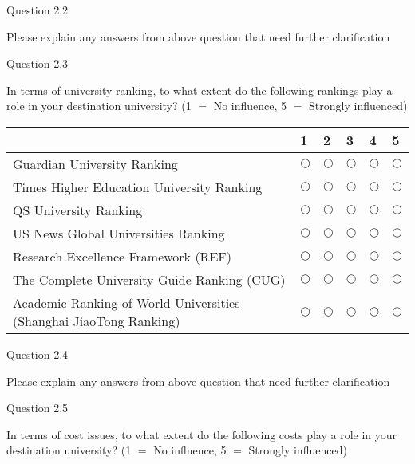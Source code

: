Question 2.2

Please explain any answers from above question that need further 
clarification

Question 2.3

In terms of university ranking, to what extent do the following rankings 
play a role in your destination university? (1 $=$ No influence, 5 $=$ 
Strongly influenced)

\begin{table}[H]
\begin{center}
\begin{tabular}{|p{6cm}|p{1cm}|p{1cm}|p{1cm}|p{1cm}|p{1cm}|}
\hline
& 
1& 
2& 
3& 
4& 
5 \\
\hline
Guardian University Ranking & 
$\bigcirc $& 
$\bigcirc $& 
$\bigcirc $& 
$\bigcirc $& 
$\bigcirc $ \\
\hline
Times Higher Education University Ranking & 
$\bigcirc $& 
$\bigcirc $& 
$\bigcirc $& 
$\bigcirc $& 
$\bigcirc $ \\
\hline
QS University Ranking & 
$\bigcirc $& 
$\bigcirc $& 
$\bigcirc $& 
$\bigcirc $& 
$\bigcirc $ \\
\hline
US News Global Universities Ranking & 
$\bigcirc $& 
$\bigcirc $& 
$\bigcirc $& 
$\bigcirc $& 
$\bigcirc $ \\
\hline
Research Excellence Framework (REF)                                       & 
$\bigcirc $& 
$\bigcirc $& 
$\bigcirc $& 
$\bigcirc $& 
$\bigcirc $ \\
\hline
The Complete University Guide Ranking (CUG)                                                                            & 
$\bigcirc $& 
$\bigcirc $& 
$\bigcirc $& 
$\bigcirc $& 
$\bigcirc $ \\
\hline
Academic Ranking of World Universities (Shanghai JiaoTong Ranking)                                                          & 
$\bigcirc $& 
$\bigcirc $& 
$\bigcirc $& 
$\bigcirc $& 
$\bigcirc $ \\
\hline
\end{tabular}
\label{tab1}
\end{center}
\end{table}

Question 2.4

Please explain any answers from above question that need further 
clarification

Question 2.5

In terms of cost issues, to what extent do the following costs play a role 
in your destination university? (1 $=$ No influence, 5 $=$ Strongly 
influenced)


